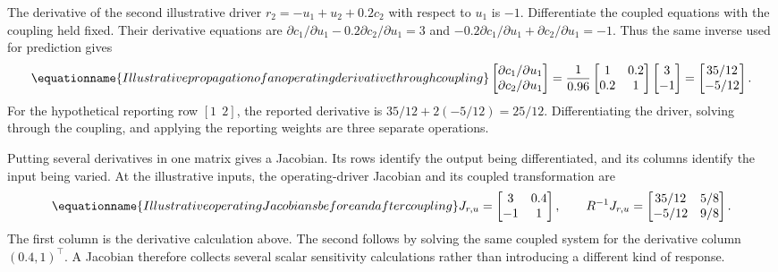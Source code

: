 The derivative of the second illustrative driver \(r_2=-u_1+u_2+0.2c_2\) with respect to \(u_1\) is \(-1\). Differentiate the coupled equations with the coupling held fixed. Their derivative equations are \(\partial c_1/\partial u_1-0.2\partial c_2/\partial u_1=3\) and \(-0.2\partial c_1/\partial u_1+\partial c_2/\partial u_1=-1\). Thus the same inverse used for prediction gives
\begin{equation}
\equationname{Illustrative propagation of an operating derivative through coupling}
\label{eq:icsor_small_chain_derivative}
\begin{bmatrix}\partial c_1/\partial u_1\\\partial c_2/\partial u_1\end{bmatrix}
=\frac{1}{0.96}\begin{bmatrix}1&0.2\\0.2&1\end{bmatrix}
\begin{bmatrix}3\\-1\end{bmatrix}
=\begin{bmatrix}35/12\\-5/12\end{bmatrix}.
\end{equation}
For the hypothetical reporting row \([1\ \ 2]\), the reported derivative is \(35/12+2(-5/12)=25/12\). Differentiating the driver, solving through the coupling, and applying the reporting weights are three separate operations.

Putting several derivatives in one matrix gives a Jacobian. Its rows identify the output being differentiated, and its columns identify the input being varied. At the illustrative inputs, the operating-driver Jacobian and its coupled transformation are
\begin{equation}
\equationname{Illustrative operating Jacobians before and after coupling}
\label{eq:icsor_small_operating_jacobian}
J_{r,u}=\begin{bmatrix}3&0.4\\-1&1\end{bmatrix},
\qquad
R^{-1}J_{r,u}=\begin{bmatrix}35/12&5/8\\-5/12&9/8\end{bmatrix}.
\end{equation}
The first column is the derivative calculation above. The second follows by solving the same coupled system for the derivative column \((0.4,1)^\top\). A Jacobian therefore collects several scalar sensitivity calculations rather than introducing a different kind of response.

